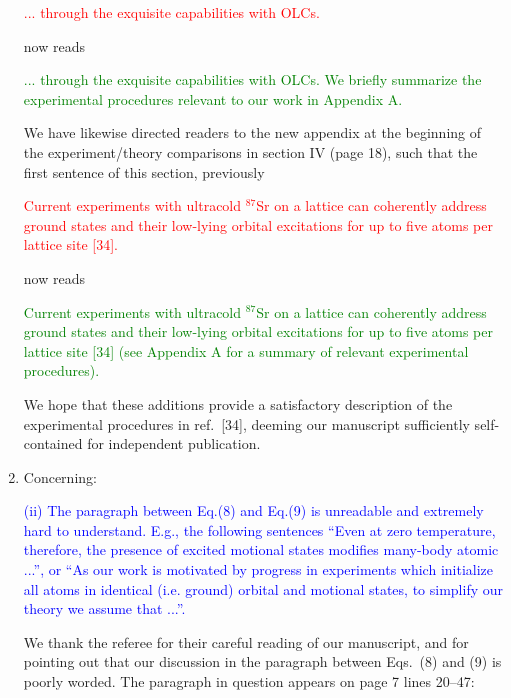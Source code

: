 \documentclass[preprint]{revtex4-1}
\newcommand{\1}{\mathds{1}}
\newcommand{\blue}[1]{\textcolor{blue}{#1}}
\newcommand{\red}[1]{\textcolor{red}{#1}}
\newcommand{\green}[1]{\textcolor{green}{#1}}
\begin{document}
\begin{enumerate}
  \red{... through the exquisite capabilities with OLCs.}

  now reads

  \green{... through the exquisite capabilities with OLCs.  We briefly
    summarize the experimental procedures relevant to our work in
    Appendix A.}

  We have likewise directed readers to the new appendix at the
  beginning of the experiment/theory comparisons in section IV (page
  18), such that the first sentence of this section, previously

  \red{Current experiments with ultracold ${}^{87}$Sr on a lattice can
    coherently address ground states and their low-lying orbital
    excitations for up to five atoms per lattice site [34].}

  now reads

  \green{Current experiments with ultracold ${}^{87}$Sr on a lattice
    can coherently address ground states and their low-lying orbital
    excitations for up to five atoms per lattice site [34] (see
    Appendix A for a summary of relevant experimental procedures).}

  We hope that these additions provide a satisfactory description of
  the experimental procedures in ref.~[34], deeming our manuscript
  sufficiently self-contained for independent publication.


\item Concerning:

  \blue{(ii) The paragraph between Eq.(8) and Eq.(9) is unreadable and
    extremely hard to understand. E.g., the following sentences ``Even
    at zero temperature, therefore, the presence of excited motional
    states modifies many-body atomic ...'', or ``As our work is
    motivated by progress in experiments which initialize all atoms in
    identical (i.e. ground) orbital and motional states, to simplify
    our theory we assume that ...''.}

  \label{pt:confusion}

  We thank the referee for their careful reading of our manuscript,
  and for pointing out that our discussion in the paragraph between
  Eqs.~(8) and (9) is poorly worded.  The paragraph in question
  appears on page 7 lines 20--47:


\end{enumerate}
\end{document}
